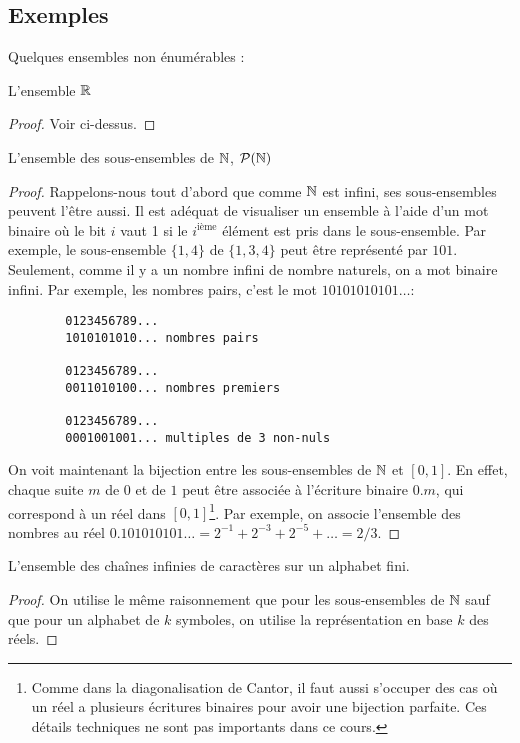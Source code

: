 \subsection{Exemples}
\label{subsec:exemples_non_enum}

Quelques ensembles non énumérables :
\begin{myexem}
 L'ensemble $\mathbb{R}$
 \begin{proof}
   Voir ci-dessus.
 \end{proof}
\end{myexem}

\begin{myexem}
 L'ensemble des sous-ensembles de $\mathbb{N}$, $\mathcal{P}(\mathbb{N})$
 \begin{proof}
   Rappelons-nous tout d'abord que comme $\mathbb{N}$ est infini, ses sous-ensembles peuvent l'être aussi.
   Il est adéquat de visualiser un ensemble à l'aide d'un mot binaire
   où le bit $i$ vaut 1 si le $i^{\mathrm{ième}}$ élément est pris dans le sous-ensemble.
   Par exemple, le sous-ensemble $\{1,4\}$ de $\{1,3,4\}$ peut être représenté par $101$.
   Seulement, comme il y a un nombre infini de nombre naturels, on a mot binaire infini.
   Par exemple, les nombres pairs, c'est le mot $10101010101\ldots$:
   \begin{verbatim}
		0123456789...
		1010101010... nombres pairs

		0123456789...
		0011010100... nombres premiers

		0123456789...
		0001001001... multiples de 3 non-nuls
    \end{verbatim}
   On voit maintenant la bijection entre les sous-ensembles de $\mathbb{N}$ et $[0,1]$.
   En effet, chaque suite $m$ de $0$ et de $1$ peut être associée à l'écriture binaire $0.m$, qui correspond à un réel dans $[0,1]$\footnote{Comme dans la diagonalisation de Cantor, il faut aussi s'occuper des cas où un réel a plusieurs écritures binaires pour avoir une bijection parfaite. Ces détails techniques ne sont pas importants dans ce cours.}. Par exemple, on associe l'ensemble des nombres au réel $0.101010101\ldots = 2^{-1}+2^{-3}+2^{-5}+\ldots = 2/3$.
 \end{proof}
\end{myexem}

\begin{myexem}
 L'ensemble des chaînes infinies de caractères sur un alphabet fini.
 \begin{proof}
   On utilise le même raisonnement que pour les sous-ensembles de $\mathbb{N}$ sauf que pour un alphabet de $k$ symboles,
   on utilise la représentation en base $k$ des réels.
 \end{proof}
\end{myexem}

